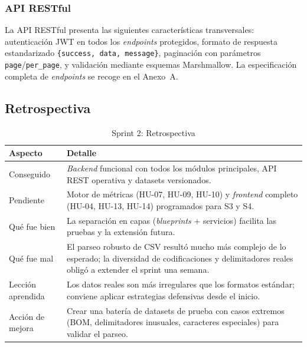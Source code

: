 \subsubsection{\acs{API} \acs{REST}ful}
\label{sec:impl-api}

La \ac{API} \ac{REST}ful presenta las siguientes características transversales:
autenticación \ac{JWT} en todos los \emph{endpoints} protegidos, formato de
respuesta estandarizado \texttt{\{success, data, message\}}, paginación con
parámetros \texttt{page}/\texttt{per\_page}, y validación mediante esquemas
Marshmallow.  La especificación completa de \emph{endpoints} se recoge en el
Anexo~A.

\subsection{Retrospectiva}

\begin{table}[htbp]
  \centering
  \small
  \caption{Sprint 2: Retrospectiva}
  \label{tab:sprint2-retro}
  \begin{tabularx}{\textwidth}{l X}
    \toprule
    \textbf{Aspecto} & \textbf{Detalle} \\
    \midrule
    Conseguido & \emph{Backend} funcional con todos los módulos principales,
      \ac{API} \ac{REST} operativa y datasets versionados. \\
    Pendiente & Motor de métricas (HU-07, HU-09, HU-10) y \emph{frontend}
      completo (HU-04, HU-13, HU-14) programados para S3 y S4. \\
    Qué fue bien & La separación en capas (\emph{blueprints} + servicios)
      facilita las pruebas y la extensión futura. \\
    Qué fue mal & El parseo robusto de \ac{CSV} resultó mucho más complejo de
      lo esperado; la diversidad de codificaciones y delimitadores reales
      obligó a extender el sprint una semana. \\
    Lección aprendida & Los datos reales son más irregulares que los formatos
      estándar; conviene aplicar estrategias defensivas desde el inicio. \\
    Acción de mejora & Crear una batería de datasets de prueba con casos
      extremos (\ac{BOM}, delimitadores inusuales, caracteres especiales) para
      validar el parseo. \\
    \bottomrule
  \end{tabularx}
\end{table}


